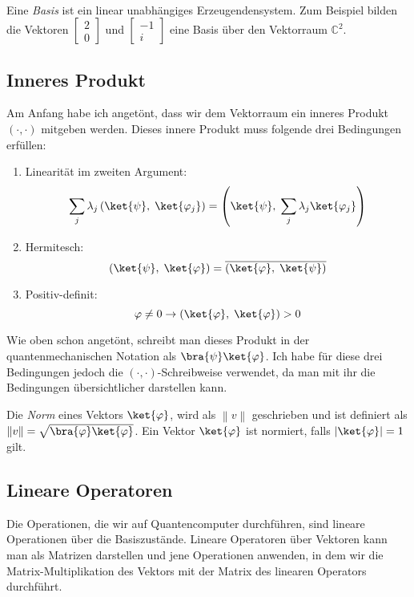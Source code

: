 \paragraph{}
Eine \textit{Basis} ist ein linear unabhängiges Erzeugendensystem.
Zum Beispiel bilden die Vektoren $\begin{bmatrix}2 \\ 0\end{bmatrix}$ und $\begin{bmatrix}-1 \\ i\end{bmatrix}$ eine Basis über den Vektorraum $\mathbb{C}^2$.

\subsection{Inneres Produkt}
Am Anfang habe ich angetönt, dass wir dem Vektorraum ein inneres Produkt $(\cdot,\cdot)$ mitgeben werden. Dieses innere Produkt muss folgende drei Bedingungen erfüllen: 
\begin{enumerate}
    \item Linearität im zweiten Argument: $$\sum_j\lambda_j\left(\ket{\psi}, \; \ket{\varphi_j}\right) = \left(\ket{\psi}, \; \sum_j\lambda_j\ket{\varphi_j}\right)$$
    \item Hermitesch: $$\left(\ket{\psi}, \; \ket{\varphi} \right) = \overline{\left(\ket{\varphi} , \; \ket{\psi}\right)}$$
    \item Positiv-definit: $$\varphi \neq 0 \rightarrow \left( \ket{\varphi}, \; \ket{\varphi} \right) > 0$$
\end{enumerate}
Wie oben schon angetönt, schreibt man dieses Produkt in der quantenmechanischen Notation als $\bra{\psi}\ket{\varphi}$. Ich habe für diese drei Bedingungen jedoch die $(\cdot, \cdot)$-Schreibweise verwendet, da man mit ihr die Bedingungen übersichtlicher darstellen kann.

Die \textit{Norm} eines Vektors $\ket{\varphi}$, wird als $\left\| v \right\|$ geschrieben und ist definiert als $\left\| v \right\| = \sqrt{\bra{\varphi}\ket{\varphi}}$. Ein Vektor $\ket{\varphi}$ ist normiert, falls $\left| \ket{\varphi} \right| = 1$ gilt.

\subsection{Lineare Operatoren}
Die Operationen, die wir auf Quantencomputer durchführen, sind lineare Operationen über die Basiszustände. Lineare Operatoren über Vektoren kann man als Matrizen darstellen und jene Operationen anwenden, in dem wir die Matrix-Multiplikation des Vektors mit der Matrix des linearen Operators durchführt.

